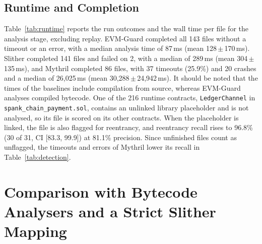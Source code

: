 \documentclass[pdflatex,sn-mathphys]{sn-jnl}
\theoremstyle{thmstyletwo}
\theoremstyle{thmstyletwo}
\begin{document}
\subsection{Runtime and Completion}\label{sec:results:runtime}
Table~\ref{tab:runtime} reports the run outcomes and the wall time per file for the analysis stage, excluding replay. EVM-Guard completed all 143 files without a timeout or an error, with a median analysis time of 87\,ms (mean 128\,$\pm$\,170\,ms). Slither completed 141 files and failed on 2, with a median of 289\,ms (mean 304\,$\pm$\,135\,ms), and Mythril completed 86 files, with 37 timeouts (25.9\%) and 20 crashes and a median of 26,025\,ms (mean 30,288\,$\pm$\,24,942\,ms). It should be noted that the times of the baselines include compilation from source, whereas EVM-Guard analyses compiled bytecode. One of the 216 runtime contracts, \texttt{LedgerChannel} in \texttt{spank\_chain\_payment.sol}, contains an unlinked library placeholder and is not analysed, so its file is scored on its other contracts. When the placeholder is linked, the file is also flagged for reentrancy, and reentrancy recall rises to 96.8\% (30 of 31, CI [83.3, 99.9]) at 81.1\% precision. Since unfinished files count as unflagged, the timeouts and errors of Mythril lower its recall in Table~\ref{tab:detection}.

\section{Comparison with Bytecode Analysers and a Strict Slither Mapping}\label{sec:baselines}
\end{document}
